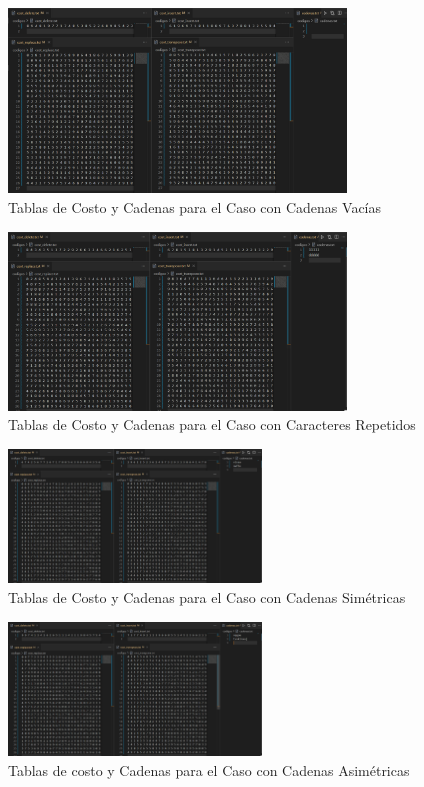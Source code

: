 \begin{figure}[ht]
  \centering
  \includegraphics[width=0.8\textwidth]{./images/Casos1.png}
  \caption{Tablas de Costo y Cadenas para el Caso con Cadenas Vacías}
  \label{fig:imagen1}
\end{figure}

\begin{figure}[ht]
  \centering
  \includegraphics[width=0.8\textwidth]{./images/Casos2.png}
  \caption{Tablas de Costo y Cadenas para el Caso con Caracteres Repetidos}
  \label{fig:imagen2}
\end{figure}

\begin{figure}[ht]
  \centering
  \includegraphics[width=0.6\textwidth]{./images/Casos3.png}
  \caption{Tablas de Costo y Cadenas para el Caso con Cadenas Simétricas}
  \label{fig:imagen3}
\end{figure}

\begin{figure}[ht]
  \centering
  \includegraphics[width=0.6\textwidth]{./images/Casos4.png}
  \caption{Tablas de costo y Cadenas para el Caso con Cadenas Asimétricas}
  \label{fig:imagen4}
\end{figure}

